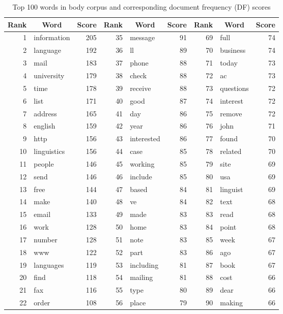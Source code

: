 \documentclass[10pt, a4paper]{article}
\begin{document}
\begin{table}[H]
\centering
\caption{Top 100 words in body corpus and corresponding document frequency (DF) scores}
\begin{tabular}{@{}rlrrlrrlr@{}}
\toprule
\textbf{Rank} & \multicolumn{1}{c}{\textbf{Word}} & \textbf{Score}
	& \textbf{Rank} & \multicolumn{1}{c}{\textbf{Word}} & \textbf{Score}
	& \textbf{Rank} & \multicolumn{1}{c}{\textbf{Word}} & \textbf{Score}\\
\midrule
1 & information & 205 & 35 & message & 91 & 69 & full & 74 \\
2 & language & 192 & 36 & ll & 89 & 70 & business & 74 \\
3 & mail & 183 & 37 & phone & 88 & 71 & today & 73 \\
4 & university & 179 & 38 & check & 88 & 72 & ac & 73 \\
5 & time & 178 & 39 & receive & 88 & 73 & questions & 72 \\
6 & list & 171 & 40 & good & 87 & 74 & interest & 72 \\
7 & address & 165 & 41 & day & 86 & 75 & remove & 72 \\
8 & english & 159 & 42 & year & 86 & 76 & john & 71 \\
9 & http & 156 & 43 & interested & 86 & 77 & found & 70 \\
10 & linguistics & 156 & 44 & case & 85 & 78 & related & 70 \\
11 & people & 146 & 45 & working & 85 & 79 & site & 69 \\
12 & send & 146 & 46 & include & 85 & 80 & usa & 69 \\
13 & free & 144 & 47 & based & 84 & 81 & linguist & 69 \\
14 & make & 140 & 48 & ve & 84 & 82 & text & 68 \\
15 & email & 133 & 49 & made & 83 & 83 & read & 68 \\
16 & work & 128 & 50 & home & 83 & 84 & point & 68 \\
17 & number & 128 & 51 & note & 83 & 85 & week & 67 \\
18 & www & 122 & 52 & part & 83 & 86 & ago & 67 \\
19 & languages & 119 & 53 & including & 81 & 87 & book & 67 \\
20 & find & 118 & 54 & mailing & 81 & 88 & cost & 66 \\
21 & fax & 116 & 55 & type & 80 & 89 & dear & 66 \\
22 & order & 108 & 56 & place & 79 & 90 & making & 66 \\

\end{tabular}
\end{table}
\end{document}

